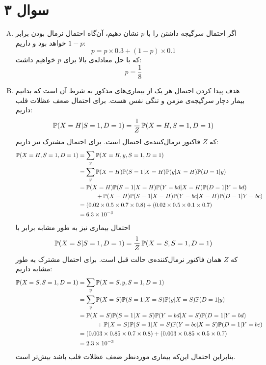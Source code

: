 \documentclass[a4paper, 12pt]{article}
\begin{document}
\section*{سوال ۳}
\begin{enumerate}[A)]
	\item
	اگر احتمال سرگیجه داشتن را با $p$ نشان دهیم، آن‌گاه احتمال نرمال بودن برابر $1-p$ خواهد بود و داریم:
	\[
	p = p\times 0.3 + (1-p)\times 0.1
	\]
	که با حل معادله‌ی بالا برای $p$ خواهیم داشت:
	\[
	p = \frac{1}{8}
	\]
	\item
	هدف پیدا کردن احتمال هر یک از بیماری‌های مذکور به شرط آن است که بدانیم بیمار دچار سرگیجه‌ی مزمن و تنگی نفس هست. برای احتمال ضعف عظلات قلب داریم:
	\[
	{\mathbb P}(X=H|S=1, D=1) = \frac{1}{Z} \,{\mathbb P}(X=H, S=1, D=1)
	\]
	که $Z$ فاکتور نرمال‌کننده‌ی احتمال است. برای احتمال مشترک نیز داریم:
	\[
	\begin{aligned}
		{\mathbb P}(X=H, S=1, D=1) &= \sum_{y}{\mathbb P}(X=H, y, S=1, D=1) \\
		&= \sum_{y} {\mathbb P}(X=H){\mathbb P}(S=1|X=H){\mathbb P}(y|X=H){\mathbb P}(D=1|y) \\
		&= {\mathbb P}(X=H){\mathbb P}(S=1|X=H){\mathbb P}(Y=bd|X=H){\mathbb P}(D=1|Y=bd) \\
		&\quad\qquad + {\mathbb P}(X=H){\mathbb P}(S=1|X=H){\mathbb P}(Y=bc|X=H){\mathbb P}(D=1|Y=bc) \\
		&= (0.02 \times 0.5 \times 0.7 \times 0.8) + (0.02 \times 0.5 \times 0.1 \times 0.7) \\
		&= 6.3 \times 10^{-3}
	\end{aligned}
	\]
	احتمال بیماری  نیز به طور مشابه برابر با
	\[
	{\mathbb P}(X=S|S=1, D=1) = \frac{1}{Z} \,{\mathbb P}(X=S, S=1, D=1)
	\]
	که $Z$ همان فاکتور نرمال‌کننده‌ی حالت قبل است. برای احتمال مشترک به طور مشابه داریم:
	\[
	\begin{aligned}
		{\mathbb P}(X=S, S=1, D=1) &= \sum_{y}{\mathbb P}(X=S, y, S=1, D=1) \\
		&= \sum_{y} {\mathbb P}(X=S){\mathbb P}(S=1|X=S){\mathbb P}(y|X=S){\mathbb P}(D=1|y) \\
		&= {\mathbb P}(X=S){\mathbb P}(S=1|X=S){\mathbb P}(Y=bd|X=S){\mathbb P}(D=1|Y=bd) \\
		&\quad\qquad + {\mathbb P}(X=S){\mathbb P}(S=1|X=S){\mathbb P}(Y=bc|X=S){\mathbb P}(D=1|Y=bc) \\
		&= (0.003 \times 0.85 \times 0.7 \times 0.8) + (0.003 \times 0.85 \times 0.5 \times 0.7) \\
		&= 2.3 \times 10^{-3}
	\end{aligned}
	\]
	بنابراین احتمال این‌که بیماری موردنظر ضعف عظلات قلب باشد بیش‌تر است.
\end{enumerate}
\end{document}
